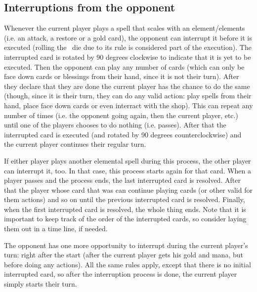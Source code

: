 \documentclass[dvipsnames,parskip,a4paper]{scrartcl}
\newcommand{\iconsize}{3.4mm}
\newcommand{\icondepth}{0.45mm}
\newcommand{\icon}[1]{\raisebox{-\icondepth}{\texttt{[image:  \#1 ]}}}
\newcommand{\chance}{\icon{icons/chance.png}}
\begin{document}
\subsection*{Interruptions from the opponent}

Whenever the current player plays a spell that scales with an element/elements (i.e. an attack, a restore or a gold card), the opponent can interrupt it before it is executed (rolling the \chance \ die due to its rule is considered part of the execution). The interrupted card is rotated by 90 degrees clockwise to indicate that it is yet to be executed. Then the opponent can play any number of cards (which can only be face down cards or blessings from their hand, since it is not their turn). After they declare that they are done the current player has the chance to do the same (though, since it is their turn, they can do any valid action: play spells from their hand, place face down cards or even interract with the shop). This can repeat any number of times (i.e. the opponent going again, then the current player, etc.) until one of the players chooses to do nothing (i.e. passes). After that the interrupted card is executed (and rotated by 90 degrees counterclockwise) and the current player continues their regular turn.

\vspace{4pt}

If either player plays another elemental spell during this process, the other player can interrupt it, too. In that case, this process starts again for that card. When a player passes and the process ends, the last interrupted card is resolved. After that the player whose card that was can continue playing cards (or other valid for them actions) and so on until the previous interrupted card is resolved. Finally, when the first interrupted card is resolved, the whole thing ends. Note that it is important to keep track of the order of the interrupted cards, so consider laying them out in a time line, if needed.

\vspace{4pt}

The opponent has one more opportunity to interrupt during the current player's turn: right after the start (after the current player gets his gold and mana, but before doing any actions). All the same rules apply, except that there is no initial interrupted card, so after the interruption process is done, the current player simply starts their turn.

\vspace{4pt}
\end{document}
